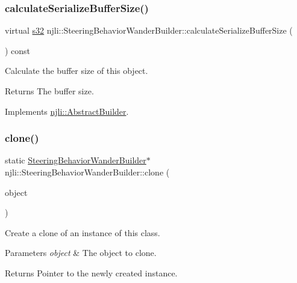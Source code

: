 \subsubsection{\texorpdfstring{calculate\+Serialize\+Buffer\+Size()}{calculateSerializeBufferSize()}}
{\footnotesize\ttfamily virtual \mbox{\hyperlink{_util_8h_aa62c75d314a0d1f37f79c4b73b2292e2}{s32}} njli\+::\+Steering\+Behavior\+Wander\+Builder\+::calculate\+Serialize\+Buffer\+Size (\begin{DoxyParamCaption}{ }\end{DoxyParamCaption}) const\hspace{0.3cm}{\ttfamily [virtual]}}

Calculate the buffer size of this object.

\begin{DoxyReturn}{Returns}
The buffer size. 
\end{DoxyReturn}


Implements \mbox{\hyperlink{classnjli_1_1_abstract_builder_aa1d220053e182c37b31b427499c6eacf}{njli\+::\+Abstract\+Builder}}.

\mbox{\label{classnjli_1_1_steering_behavior_wander_builder_a3cbf7454690383954fdeefb6a05a563e}} 
\subsubsection{\texorpdfstring{clone()}{clone()}}
{\footnotesize\ttfamily static \mbox{\hyperlink{classnjli_1_1_steering_behavior_wander_builder}{Steering\+Behavior\+Wander\+Builder}}$\ast$ njli\+::\+Steering\+Behavior\+Wander\+Builder\+::clone (\begin{DoxyParamCaption}\item[{const \mbox{\hyperlink{classnjli_1_1_steering_behavior_wander_builder}{Steering\+Behavior\+Wander\+Builder}} \&}]{object }\end{DoxyParamCaption})\hspace{0.3cm}{\ttfamily [static]}}

Create a clone of an instance of this class.


\begin{DoxyParams}{Parameters}
{\em object} & The object to clone.\\
\hline
\end{DoxyParams}
\begin{DoxyReturn}{Returns}
Pointer to the newly created instance. 
\end{DoxyReturn}
\mbox{\label{classnjli_1_1_steering_behavior_wander_builder_ace6ff70bccb471890aff7eb404e91c73}} 

